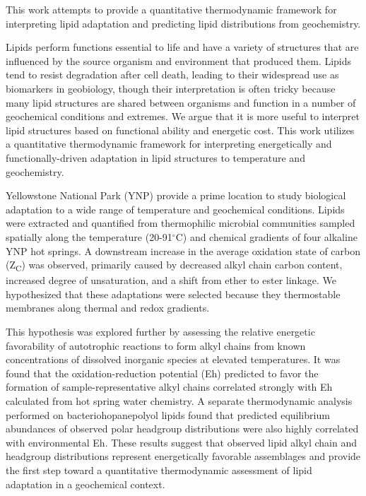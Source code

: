 This work attempts to provide a quantitative thermodynamic framework for interpreting lipid adaptation and predicting lipid distributions from geochemistry.


Lipids perform functions essential to life and have a variety of structures that are influenced by the source organism and environment that produced them. Lipids tend to resist degradation after cell death, leading to their widespread use as biomarkers in geobiology, though their interpretation is often tricky because many lipid structures are shared between organisms and function in a number of geochemical conditions and extremes. We argue that it is more useful to interpret lipid structures based on functional ability and energetic cost. This work utilizes a quantitative thermodynamic framework for interpreting energetically and functionally-driven adaptation in lipid structures to temperature and geochemistry.

Yellowstone National Park (YNP) provide a prime location to study biological adaptation to a wide range of temperature and geochemical conditions. Lipids were extracted and quantified from thermophilic microbial communities sampled spatially along the temperature (20-91$^{\circ}$C) and chemical gradients of four alkaline YNP hot springs. A downstream increase in the average oxidation state of carbon (Z\textsubscript{C}) was observed, primarily caused by decreased alkyl chain carbon content, increased degree of unsaturation, and a shift from ether to ester linkage. We hypothesized that these adaptations were selected because they thermostable membranes along thermal and redox gradients.

This hypothesis was explored further by assessing the relative energetic favorability of autotrophic reactions to form alkyl chains from known concentrations of dissolved inorganic species at elevated temperatures. It was found that the oxidation-reduction potential (Eh) predicted to favor the formation of sample-representative alkyl chains correlated strongly with Eh calculated from hot spring water chemistry. A separate thermodynamic analysis performed on bacteriohopanepolyol lipids found that predicted equilibrium abundances of observed polar headgroup distributions were also highly correlated with environmental Eh. These results suggest that observed lipid alkyl chain and headgroup distributions represent energetically favorable assemblages and provide the first step toward a quantitative thermodynamic assessment of lipid adaptation in a geochemical context.




